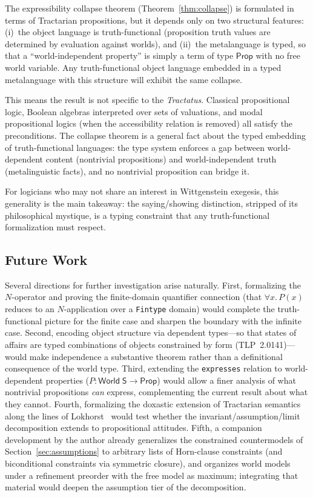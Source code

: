 \documentclass[10pt, letterpaper]{article}
\theoremstyle{definition}
\theoremstyle{remark}
\newcommand{\Sach}{\mathsf{S}}
\newcommand{\World}{\mathsf{World}}
\newcommand{\Prop}{\mathsf{Prop}}
\begin{document}
The expressibility collapse theorem
(Theorem~\ref{thm:collapse}) is formulated in terms of
Tractarian propositions, but it depends only on two structural
features: (i)~the object language is truth-functional
(proposition truth values are determined by evaluation against
worlds), and (ii)~the metalanguage is typed, so that a
``world-independent property'' is simply a term of type
$\Prop$ with no free world variable.  Any truth-functional
object language embedded in a typed metalanguage with this
structure will exhibit the same collapse.

This means the result is not specific to the
\emph{Tractatus}.  Classical propositional logic, Boolean
algebras interpreted over sets of valuations, and modal
propositional logics (when the accessibility relation is
removed) all satisfy the preconditions.  The collapse theorem
is a general fact about the typed embedding of truth-functional
languages: the type system enforces a gap between
world-dependent content (nontrivial propositions) and
world-independent truth (metalinguistic facts), and no
nontrivial proposition can bridge it.

For logicians who may not share an interest in Wittgenstein
exegesis, this generality is the main takeaway: the
saying/showing distinction, stripped of its philosophical
mystique, is a typing constraint that any truth-functional
formalization must respect.

\subsection{Future Work}
\label{sec:future}

Several directions for further investigation arise naturally.
First, formalizing the $N$-operator and proving the
finite-domain quantifier connection (that $\forall x.\, P(x)$
reduces to an $N$-application over a \texttt{Fintype} domain)
would complete the truth-functional picture for the finite
case and sharpen the boundary with the infinite case.
Second, encoding object structure via dependent types---so
that states of affairs are typed combinations of objects
constrained by form (TLP~2.0141)---would make independence
a substantive theorem rather than a definitional consequence
of the world type.
Third, extending the \texttt{expresses} relation to
world-dependent properties ($P : \World\;\Sach \to \Prop$)
would allow a finer analysis of what nontrivial propositions
\emph{can} express, complementing the current result about
what they cannot.
Fourth, formalizing the doxastic extension of Tractarian
semantics along the lines of Lokhorst~\cite{lokhorst1988}
would test whether the invariant/assumption/limit decomposition
extends to propositional attitudes.
Fifth, a companion development by the author already generalizes
the constrained countermodels of Section~\ref{sec:assumptions}
to arbitrary lists of Horn-clause constraints (and biconditional
constraints via symmetric closure), and organizes world models
under a refinement preorder with the free model as maximum;
integrating that material would deepen the assumption tier of
the decomposition.
\end{document}
